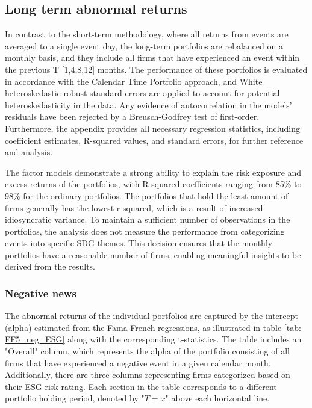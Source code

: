 \subsection{Long term abnormal returns} \label{sec: long_term_portfolio}

In contrast to the short-term methodology, where all returns from events are averaged to a single event day, the long-term portfolios are rebalanced on a monthly basis, and they include all firms that have experienced an event within the previous T [1,4,8,12] months. The performance of these portfolios is evaluated in accordance with the Calendar Time Portfolio approach, and White heteroskedastic-robust standard errors are applied to account for potential heteroskedasticity in the data. Any evidence of autocorrelation in the models' residuals have been rejected by a Breusch-Godfrey test of first-order. Furthermore, the appendix provides all necessary regression statistics, including coefficient estimates, R-squared values, and standard errors, for further reference and analysis.

The factor models demonstrate a strong ability to explain the risk exposure and excess returns of the portfolios, with R-squared coefficients ranging from 85\% to 98\% for the ordinary portfolios. The portfolios that hold the least amount of firms generally has the lowest r-squared, which is a result of increased idiosyncratic variance. To maintain a sufficient number of observations in the portfolios, the analysis does not measure the performance from categorizing events into specific SDG themes. This decision ensures that the monthly portfolios have a reasonable number of firms, enabling meaningful insights to be derived from the results.

\subsubsection{Negative news}



The abnormal returns of the individual portfolios are captured by the intercept (alpha) estimated from the Fama-French regressions, as illustrated in table \ref{tab: FF5_neg_ESG} along with the corresponding t-statistics. The table includes an "Overall" column, which represents the alpha of the portfolio consisting of all firms that have experienced a negative event in a given calendar month. Additionally, there are three columns representing firms categorized based on their ESG risk rating. Each section in the table corresponds to a different portfolio holding period, denoted by "$T = x$" above each horizontal line.

